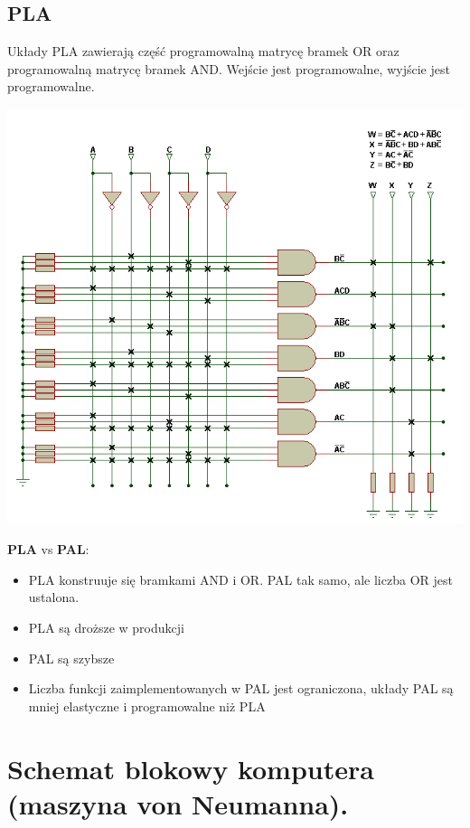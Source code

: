\documentclass[12pt]{article}
\begin{document}
    \subsection{PLA}
        Układy PLA zawierają część programowalną matrycę bramek OR oraz programowalną
        matrycę bramek AND.
        Wejście jest programowalne, wyjście jest programowalne.
       \begin{center}
         \includegraphics[scale=0.7]{graphics/pla.png}
        \end{center}
    
        \textbf{PLA} vs \textbf{PAL}:
        \begin{itemize}
            \item PLA konstruuje się bramkami AND i OR. PAL tak samo, ale liczba
            OR jest ustalona.
            \item PLA są droższe w produkcji
            \item PAL są szybsze
            \item Liczba funkcji zaimplementowanych w PAL jest ograniczona,
            układy PAL są mniej elastyczne i programowalne niż PLA
        \end{itemize}
    \newpage
    
    \section{Schemat blokowy komputera (maszyna von Neumanna).}
    
\end{document}
